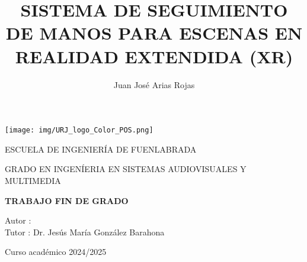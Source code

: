\documentclass[a4paper, 12pt]{book}
\title{SISTEMA DE SEGUIMIENTO DE MANOS PARA ESCENAS EN REALIDAD EXTENDIDA (XR)}
\author{Juan José Arias Rojas}
\makeatletter
\let\thetitle\@title
\let\theauthor\@author
\makeatother
\begin{document}
\renewcommand{\refname}{Bibliografía}  %
\renewcommand{\appendixname}{Apéndice}



\begin{titlepage}
	\begin{center}
		\texttt{[image: img/URJ\_logo\_Color\_POS.png]}

		\vspace{1.75cm}

		\LARGE
		ESCUELA DE INGENIERÍA DE FUENLABRADA
		\vspace{1cm}

		\LARGE
		GRADO EN INGENÍERIA EN SISTEMAS AUDIOVISUALES Y MULTIMEDIA

		\vspace{1cm}
		\LARGE
		\textbf{TRABAJO FIN DE GRADO}

		\vspace{2cm}

		\Large
		\MakeUppercase{\thetitle}

		\vspace{2cm}

		\large
		Autor : \theauthor \\
		Tutor : Dr. Jesús María González Barahona\\
		\vspace{1cm}

		\large
		Curso académico 2024/2025

	\end{center}
\end{titlepage}

\newpage
\mbox{}
\thispagestyle{empty} %



\clearpage
{}
\chapter*{}

\vspace{12cm}
\end{document}
